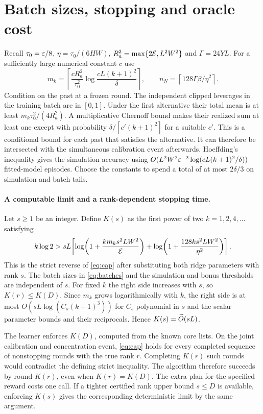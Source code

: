 \section{Batch sizes, stopping and oracle cost}\label{app:budget}
Recall $\tau_0=\varepsilon/8$, $\eta=\tau_0/(6HW)$, $R_a^2=\max\{2\mathcal E,L^2W^2\}$ and $\Gamma=24YL$. For a sufficiently large numerical constant $c$ use
\begin{equation}
 m_k=\left\lceil \frac{cR_a^2}{\tau_0^2}
        \log\frac{cL(k+1)^2}{\delta}\right\rceil,\qquad
 n_N=\left\lceil128\Gamma\beta/\eta^2\right\rceil .
 \label{eq:batches}
\end{equation}
Condition on the past at a frozen round. The independent clipped leverages in the training batch are in $[0,1]$. Under the first alternative their total mean is at least $m_k\tau_0^2/(4R_a^2)$. A multiplicative Chernoff bound makes their realized sum at least one except with probability $\delta/[c'(k+1)^2]$ for a suitable $c'$. This is a conditional bound for each past that satisfies the alternative. It can therefore be intersected with the simultaneous calibration event afterwards. Hoeffding's inequality gives the simulation accuracy using $O(L^2W^2\varepsilon^{-2}\log(cL(k+1)^2/\delta))$ fitted-model episodes. Choose the constants to spend a total of at most $2\delta/3$ on simulation and batch tails.

\paragraph{A computable limit and a rank-dependent stopping time.}
Let $s\ge1$ be an integer. Define $K(s)$ as the first power of two $k=1,2,4,\ldots$ satisfying
\[
 k\log 2 > sL\!\left[
   \log\!\left(1+\frac{k m_k s^2 LW^2}{\mathcal E}\right)
   +\log\!\left(1+\frac{128k s^2 LW^2}{\eta^2}\right)\right].
\]
This is the strict reverse of \eqref{eq:cap} after substituting both ridge parameters with rank $s$. The batch sizes in \eqref{eq:batches} and the simulation and bonus thresholds are independent of $s$. For fixed $k$ the right side increases with $s$, so $K(r)\le K(D)$. Since $m_k$ grows logarithmically with $k$, the right side is at most $O(sL\log(C_s(k+1)^3))$ for $C_s$ polynomial in $s$ and the scalar parameter bounds and their reciprocals. Hence $K(s)=\widetilde O(sL)$.

The learner enforces $K(D)$, computed from the known core lists. On the joint calibration and concentration event, \eqref{eq:cap} holds for every completed sequence of nonstopping rounds with the true rank $r$. Completing $K(r)$ such rounds would contradict the defining strict inequality. The algorithm therefore succeeds by round $K(r)$, even when $K(r)=K(D)$. The extra plan for the specified reward costs one call. If a tighter certified rank upper bound $s\le D$ is available, enforcing $K(s)$ gives the corresponding deterministic limit by the same argument.

